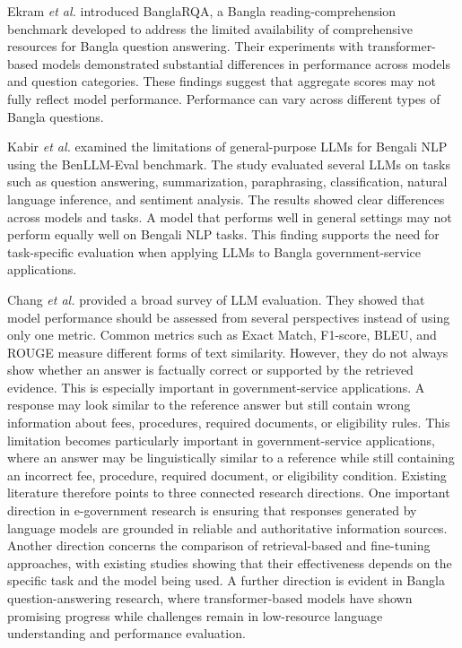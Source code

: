 \documentclass[10pt,journal,compsoc]{IEEEtran}
\begin{document}
Ekram \textit{et al.} \cite{ekram2022banglarqa} introduced BanglaRQA, a Bangla reading-comprehension benchmark developed to address the limited availability of comprehensive resources for Bangla question answering. Their experiments with transformer-based models demonstrated substantial differences in performance across models and question categories. These findings suggest that aggregate scores may not fully reflect model performance. Performance can vary across different types of Bangla questions.

Kabir  \textit{et al.} \cite{kabir2024benllm} examined the limitations of general-purpose LLMs for Bengali NLP using the BenLLM-Eval benchmark. The study evaluated several LLMs on tasks such as question answering, summarization, paraphrasing, classification, natural language inference, and sentiment analysis. The results showed clear differences across models and tasks. A model that performs well in general settings may not perform equally well on Bengali NLP tasks. This finding supports the need for task-specific evaluation when applying LLMs to Bangla government-service applications.

Chang  \textit{et al.} \cite{chang2024llmevaluation}  provided a broad survey of LLM evaluation. They showed that model performance should be assessed from several perspectives instead of using only one metric. Common metrics such as Exact Match, F1-score, BLEU, and ROUGE measure different forms of text similarity. However, they do not always show whether an answer is factually correct or supported by the retrieved evidence. This is especially important in government-service applications. A response may look similar to the reference answer but still contain wrong information about fees, procedures, required documents, or eligibility rules.
This limitation becomes particularly important in government-service applications, where an answer may be linguistically similar to a reference while still containing an incorrect fee, procedure, required document, or eligibility condition.
Existing literature therefore points to three connected research directions. One important direction in e-government research is ensuring that responses generated by language models are grounded in reliable and authoritative information sources. Another direction concerns the comparison of retrieval-based and fine-tuning approaches, with existing studies showing that their effectiveness depends on the specific task and the model being used. A further direction is evident in Bangla question-answering research, where transformer-based models have shown promising progress while challenges remain in low-resource language understanding and performance evaluation.
\end{document}
